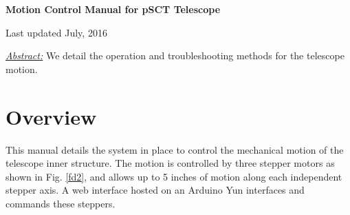 \documentclass[11pt]{article}
\begin{document}
\begin{center}
{\bf{\huge{Motion Control Manual for pSCT Telescope}}}

\vspace{0.1in}
Last updated July, 2016

\vspace{0.3in}
{\it{\underline{Abstract:}}} We detail the operation and troubleshooting methods for the telescope motion.

\end{center}

\tableofcontents

\vspace{0.2in}


\section{Overview}

This manual details the system in place to control the mechanical motion of the telescope inner structure.
The motion is controlled by three stepper motors as shown in Fig. \ref{fd2}, and allows up to 5 inches of motion along each independent stepper axis. 
A web interface hosted on an Arduino Yun interfaces and commands these steppers.
\end{document}
